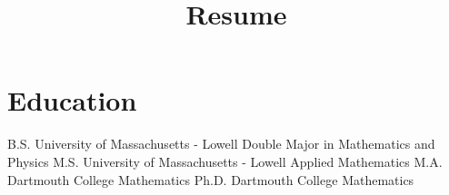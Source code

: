 \documentclass[a4paper,sans]{moderncv}
\title{Resume}
\begin{document}
    \makecvtitle
    \vspace{-8ex}
    \section{Education}
            {B.S.}
            {University of Massachusetts - Lowell}
            {}
            {}
            {Double Major in Mathematics and Physics}
            {M.S.}
            {University of Massachusetts - Lowell}
            {}
            {}
            {Applied Mathematics}
            {M.A.}
            {Dartmouth College}
            {}
            {}
            {Mathematics}
            {Ph.D.}
            {Dartmouth College}
            {}
            {}
            {Mathematics}
\end{document}
